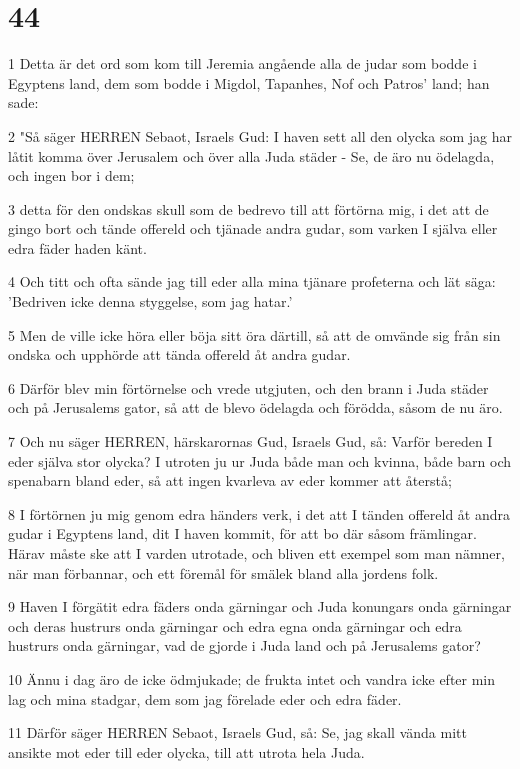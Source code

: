 \chapter{44}

\par 1 Detta är det ord som kom till Jeremia angående alla de judar som bodde i Egyptens land, dem som bodde i Migdol, Tapanhes, Nof och Patros' land; han sade:
\par 2 "Så säger HERREN Sebaot, Israels Gud: I haven sett all den olycka som jag har låtit komma över Jerusalem och över alla Juda städer - Se, de äro nu ödelagda, och ingen bor i dem;
\par 3 detta för den ondskas skull som de bedrevo till att förtörna mig, i det att de gingo bort och tände offereld och tjänade andra gudar, som varken I själva eller edra fäder haden känt.
\par 4 Och titt och ofta sände jag till eder alla mina tjänare profeterna och lät säga: 'Bedriven icke denna styggelse, som jag hatar.'
\par 5 Men de ville icke höra eller böja sitt öra därtill, så att de omvände sig från sin ondska och upphörde att tända offereld åt andra gudar.
\par 6 Därför blev min förtörnelse och vrede utgjuten, och den brann i Juda städer och på Jerusalems gator, så att de blevo ödelagda och förödda, såsom de nu äro.
\par 7 Och nu säger HERREN, härskarornas Gud, Israels Gud, så: Varför bereden I eder själva stor olycka? I utroten ju ur Juda både man och kvinna, både barn och spenabarn bland eder, så att ingen kvarleva av eder kommer att återstå;
\par 8 I förtörnen ju mig genom edra händers verk, i det att I tänden offereld åt andra gudar i Egyptens land, dit I haven kommit, för att bo där såsom främlingar. Härav måste ske att I varden utrotade, och bliven ett exempel som man nämner, när man förbannar, och ett föremål för smälek bland alla jordens folk.
\par 9 Haven I förgätit edra fäders onda gärningar och Juda konungars onda gärningar och deras hustrurs onda gärningar och edra egna onda gärningar och edra hustrurs onda gärningar, vad de gjorde i Juda land och på Jerusalems gator?
\par 10 Ännu i dag äro de icke ödmjukade; de frukta intet och vandra icke efter min lag och mina stadgar, dem som jag förelade eder och edra fäder.
\par 11 Därför säger HERREN Sebaot, Israels Gud, så: Se, jag skall vända mitt ansikte mot eder till eder olycka, till att utrota hela Juda.
